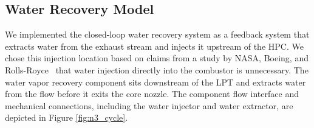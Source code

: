 \documentclass[conf]{new-aiaa}
\begin{document}


\subsection{Water Recovery Model}
We implemented the closed-loop water recovery system as a feedback system that extracts water from the exhaust stream and injects it upstream of the HPC.
We chose this injection location based on claims from a study by NASA, Boeing, and Rolls-Royce~\cite{Daggett2010} that water injection directly into the combustor is unnecessary.
The water vapor recovery component sits downstream of the LPT and extracts water from the flow before it exits the core nozzle.
The component flow interface and mechanical connections, including the water injector and water extractor, are depicted in Figure \ref{fig:n3_cycle}.
\end{document}
